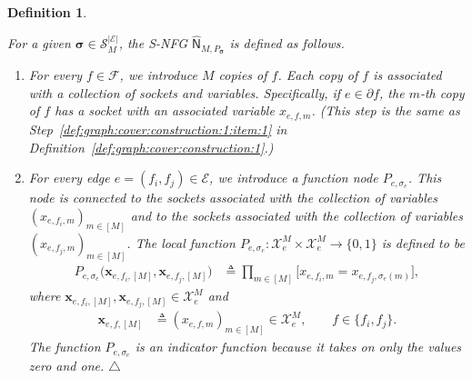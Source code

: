 \documentclass[journal]{IEEEtran}
\newcommand{\add}[1]{{\color{black}#1}}
\newtheorem{definition}[theorem]{Definition}
\newcommand{\manualendsymbol}[1]{%
  \leavevmode\unskip\penalty9999\hbox{}\nobreak\hfill
  \quad\hbox{#1}}
\newcommand{\edefinition}{\manualendsymbol{\ensuremath{\triangle}}}
\newcommand{\vect}[1]{ \bm{#1} }
\newcommand{\set}[1]{\mathcal{#1}}
\newcommand{\setEfull}{ \mathcal{E} }
\newcommand{\setpf}{ \partial f }
\newcommand{\vx}{ \vect{x} }
\newcommand{\graphN}{ \mathsf{N} }
\newcommand{\defeq}{ \triangleq }
\newcommand{\hgraphN}{ \hat{\graphN} }
\newcommand{\vsigma}{\vect{\sigma}}
\newcommand{\ef}{ e,f }
\newcommand{\efi}{ e,f_i }
\newcommand{\efj}{ e,f_j }
\newcommand{\hgraphPsig}{ \hgraphN_{M,P_{\vsigma}} }
\begin{document}
\begin{definition}
  \label{sec:sst:def:1}

  For a given $\vsigma \in \set{S}_M^{|\setEfull|}$, the S-NFG
  $\hgraphPsig$ is defined as follows.
  \begin{enumerate}

    \item For every $f \in \set{F}$, we introduce $M$ copies of $f$.
          Each copy of $f$ is associated with a collection of sockets and variables. Specifically, if $e \in \setpf$, the $m$-th copy of $f$ has a socket with an associated variable $x_{\ef,m}$. (This step is the same as Step~\ref{def:graph:cover:construction:1:item:1} in Definition~\ref{def:graph:cover:construction:1}.)

    \item For every edge $e = (f_{i}, f_{j}) \in \setEfull$, we introduce a function node
          $P_{e,\sigma_e}$. This node is connected to the sockets associated with the collection of
          variables $(x_{\efi,m})_{m \in [M]}$ and to the sockets associated with the collection of variables
          $(x_{\efj,m})_{m \in [M]}$. The local function $P_{e,\sigma_e}: \set{X}_e^{M} \times \set{X}_e^{M}  \to  \{0,1\} $ is
          defined to be
          \begin{align*}
            P_{e,\sigma_e}\bigl( \vx_{\efi,[M]}, \vx_{\efj,[M]} \bigr)
             & \defeq
            \prod_{m \in [M]}
            \bigl[
              x_{\efi,m} \! = \! x_{\efj,\sigma_e(m)}
              \bigr],
          \end{align*}
          where $\vx_{\efi,[M]}, \vx_{\efj,[M]} \in \set{X}_e^M$ and
          \begin{align*}
            \vx_{\ef,[M]}
             & \defeq
               (x_{\ef,m})_{m \in [M]} \in  \set{X}_e^M, \qquad
            f \in \{f_{i}, f_{j}\}.
          \end{align*}
          \add{The function $P_{e,\sigma_e}$ is an indicator function because
            it takes on only the values zero and one.}\edefinition

  \end{enumerate}
\end{definition}
\end{document}

